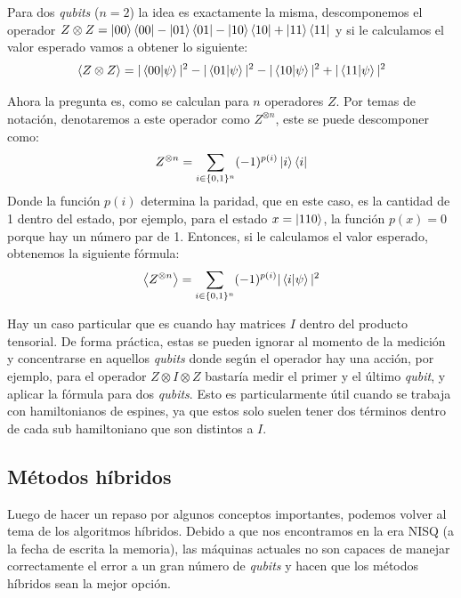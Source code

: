 Para dos \textit{qubits} ($n=2$) la idea es exactamente la misma, descomponemos el operador $Z \otimes Z =\ket{00}\bra{00} - \ket{01}\bra{01} - \ket{10}\bra{10} + \ket{11}\bra{11}$ y si le calculamos el valor esperado vamos a obtener lo siguiente:
\begin{equation*}
    \expval{Z \otimes Z}  = |\bra{00}\ket{\psi}|^2 - |\bra{01}\ket{\psi}|^2 -  |\bra{10}\ket{\psi}|^2 + |\bra{11}\ket{\psi}|^2
\end{equation*}

Ahora la pregunta es, como se calculan para $n$ operadores $Z$. Por temas de notación, denotaremos a este operador como $Z^{\otimes n}$, este se puede descomponer como:
\begin{equation*}
    Z^{\otimes n} = \sum_{ i \in \{ 0,1\}^{n}} (-1)^{p(i)}\ket{i}\bra{i}
\end{equation*}
Donde la función $p(i)$ determina la paridad, que en este caso, es la cantidad de 1 dentro del estado, por ejemplo, para el estado $x = \ket{110}$, la función $p(x)=0$ porque hay un número par de 1. Entonces, si le calculamos el valor esperado, obtenemos la siguiente fórmula:
\begin{equation*}
    \expval{Z^{\otimes n}} = \sum_{ i \in \{ 0,1\}^{n}} (-1)^{p(i)}|\bra{i}\ket{\psi}|^2
\end{equation*}

Hay un caso particular que es cuando hay matrices $I$ dentro del producto tensorial. De forma práctica, estas se pueden ignorar al momento de la medición y concentrarse en aquellos \textit{qubits} donde según el operador hay una acción, por ejemplo, para el operador $Z \otimes I \otimes Z$ bastaría medir el primer y el último \textit{qubit}, y aplicar la fórmula para dos \textit{qubits}. Esto es particularmente útil cuando se trabaja con hamiltonianos de espines, ya que estos solo suelen tener dos términos dentro de cada sub hamiltoniano que son distintos a $I$.



\subsection{Métodos híbridos}
Luego de hacer un repaso por algunos conceptos importantes, podemos volver al tema de los algoritmos híbridos. Debido a que nos encontramos en la era NISQ (a la fecha de escrita la memoria), las máquinas actuales no son capaces de manejar correctamente el error a un gran número de \textit{qubits} y hacen que los métodos híbridos sean la mejor opción. 


